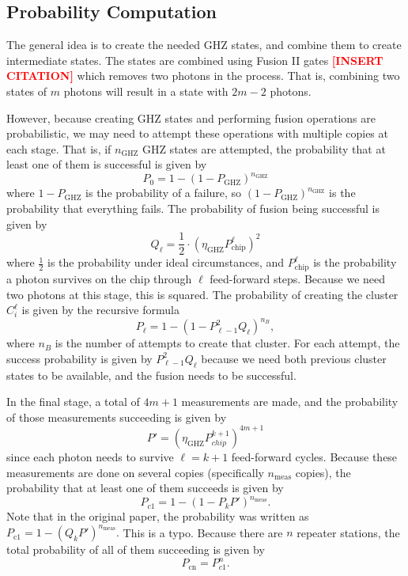 \documentclass[%
 reprint,
 amsmath,amssymb
 aps,
]{revtex4}
\theoremstyle{remark}
\begin{document}
\subsection{Probability Computation}
The general idea is to create the needed GHZ states, and combine them to create intermediate states. The states are combined using Fusion II gates \textcolor{red}{\textbf{[INSERT CITATION]}} which removes two photons in the process. That is, combining two states of $m$ photons will result in a state with $2m-2$ photons.
\vspace{2mm}

However, because creating GHZ states and performing fusion operations are probabilistic, we may need to attempt these operations with multiple copies at each stage. That is, if $n_\text{GHZ}$ GHZ states are attempted, the probability that at least one of them is successful is given by
$$P_0 = 1 - (1 - P_\text{GHZ})^{n_\text{GHZ}}$$
where $1-P_\text{GHZ}$ is the probability of a failure, so $(1 - P_\text{GHZ})^{n_\text{GHZ}}$ is the probability that everything fails. The probability of fusion being successful is given by 
\begin{equation}
    Q_\ell = \frac{1}{2} \cdot (\eta_\text{GHZ}P^{\ell}_\text{chip})^2
\end{equation}
where $\frac{1}{2}$ is the probability under ideal circumstances, and $P_\text{chip}^{\ell}$ is the probability a photon survives on the chip through $\ell$ feed-forward steps. Because we need two photons at this stage, this is squared. The probability of creating the cluster $C^{\ell}_i$ is given by the recursive formula 
\begin{equation}
    P_\ell = 1 - (1 - P^2_{\ell - 1} Q_{\ell})^{n_B},
\end{equation}
where $n_B$ is the number of attempts to create that cluster. For each attempt, the success probability is given by $P^2_{\ell - 1} Q_{\ell}$ because we need both previous cluster states to be available, and the fusion needs to be successful.
\vspace{2mm}

In the final stage, a total of $4m+1$ measurements are made, and the probability of those measurements succeeding is given by
\begin{equation}
    P' = (\eta_\text{GHZ}P_{chip}^{k+1})^{4m+1}
\end{equation} 
since each photon needs to survive $\ell = k+1$ feed-forward cycles. Because these measurements are done on several copies (specifically $n_\text{meas}$ copies), the probability that at least one of them succeeds is given by
\begin{equation}
    P_{c1} = 1 - (1-P_kP')^{n_\text{meas}}.
\end{equation}
Note that in the original paper, the probability was written as $P_\text{c1} = 1 - (Q_kP')^{n_\text{meas}}.$ This is a typo. Because there are $n$ repeater stations, the total probability of all of them succeeding is given by 
\begin{equation}
    P_\text{cn} = P_{c1}^n.
\end{equation}
\end{document}
